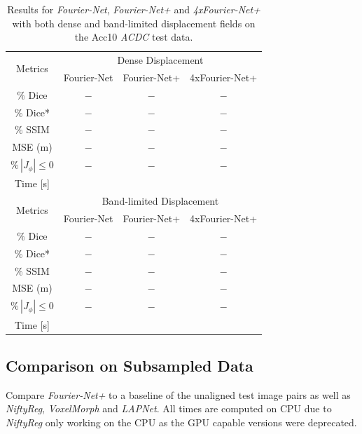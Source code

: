 \documentclass[english,version-2022-01]{uzl-thesis} %
\begin{document}
\begin{table}[h] %
	\centering
	\caption{Results for \emph{Fourier-Net}, \emph{Fourier-Net+} and \emph{4xFourier-Net+} with both dense and band-limited displacement fields on the Acc10 \emph{ACDC} test data.}
	\label{tab:DenseDisplacementAcc10}
	\begin{tabular}{c c c c} %
		\toprule
		\multirow{2}{*}{Metrics} & \multicolumn{3}{c}{Dense Displacement} \\
		\cline{2-4} 
		 & Fourier-Net & Fourier-Net+ & 4xFourier-Net+\\	
		\midrule
		$\%$ Dice & $-$ & $-$ & $-$\\
		$\%$ Dice* & $-$ & $-$ & $-$ \\
		$\%$ SSIM & $-$ & $-$ & $-$\\
		MSE (m) & $-$ & $-$ & $-$ \\
		$\% \, |J_{\phi}|\leq0$ & $-$ & $-$ & $-$ \\
		Time [s] 	  &   	&  	&   \\
		\midrule
		\multirow{2}{*}{Metrics} & \multicolumn{3}{c}{Band-limited Displacement} \\
		\cline{2-4} 
		 & Fourier-Net & Fourier-Net+ & 4xFourier-Net+\\		
		\midrule
		$\%$ Dice & $-$ & $-$ & $-$\\
		$\%$ Dice* & $-$ & $-$ & $-$ \\
		$\%$ SSIM & $-$ & $-$ & $-$\\
		MSE (m) & $-$ & $-$ & $-$ \\
		$\% \, |J_{\phi}|\leq0$ & $-$ & $-$ & $-$ \\
		Time [s] 	  &   	&  	&   \\
		\bottomrule
	\end{tabular}	
\end{table}


\subsection{Comparison on Subsampled Data} \label{SubSec:ResultsComparisonSubsampling}
Compare \emph{Fourier-Net+} to a baseline of the unaligned test image pairs as well as \emph{NiftyReg}, \emph{VoxelMorph} and \emph{LAPNet}. All times are computed on CPU due to \emph{NiftyReg} only working on the CPU as the GPU capable versions were deprecated.
\end{document}
